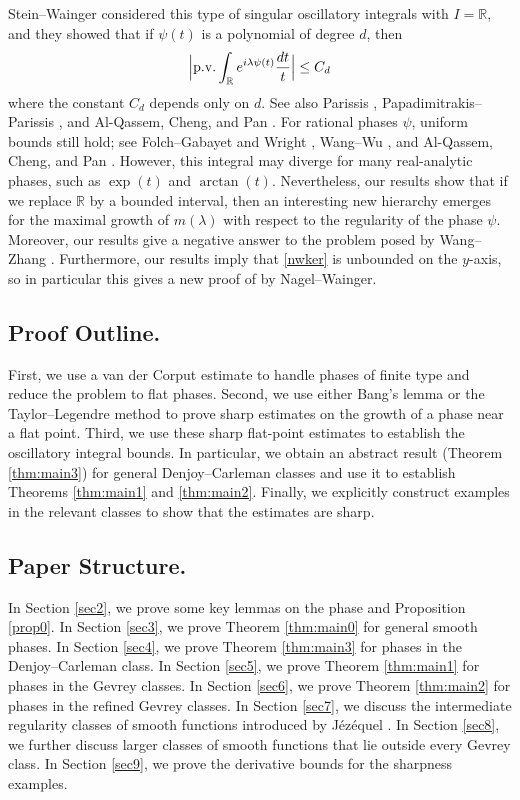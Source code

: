 \documentclass[11pt]{amsart}
\newcommand{\la}{\lambda}
\newcommand{\1}{{\rm 1\hspace*{-0.4ex}%
			\rule{0.1ex}{1.52ex}\hspace*{0.2ex}}}
\numberwithin{equation}{section}
\begin{document}
Stein--Wainger \cite{sw70} considered this type of singular oscillatory integrals with $I=\mathbb{R}$, and they showed that if $\psi(t)$ is a polynomial of degree $d$, then
\[\Big|{\rm p . v .} \int_{\mathbb{R}} e^{i\lambda\psi(t)} \frac{d t}{t}\Big|\le C_d\]
where the constant $C_d$ depends only on $d$. See also Parissis \cite{pa08}, Papadimitrakis--Parissis \cite{pp10}, and Al-Qassem, Cheng, and Pan \cite{acp14}. For rational phases $\psi$, uniform bounds still hold; see Folch--Gabayet and Wright \cite{fw03,fw032}, Wang--Wu \cite{ww23}, and Al-Qassem, Cheng, and Pan \cite{acp25}. However, this integral may diverge for many real-analytic phases, such as $\exp(t)$ and $\arctan(t)$. Nevertheless, our results show that if we replace $\mathbb{R}$ by a bounded interval, then an interesting new hierarchy emerges for the maximal growth of $m(\la)$ with respect to the regularity of the phase $\psi$. Moreover, our results give a negative answer to the problem posed by Wang--Zhang \cite[Problem 4 in Section 4]{wz21}. Furthermore, our results imply that \eqref{nwker} is unbounded on the $y$-axis, so in particular this gives a new proof of \cite[Theorem 4.1]{nw} by Nagel--Wainger.

\subsection{Proof Outline.} First, we use a van der Corput estimate to handle phases of finite type and reduce the problem to flat phases. Second, we use either Bang's lemma or the Taylor--Legendre method to prove sharp estimates on the growth of a phase near a flat point. Third, we use these sharp flat-point estimates to establish the oscillatory integral bounds. In particular, we obtain an abstract result (Theorem \ref{thm:main3}) for general Denjoy--Carleman classes and use it to establish Theorems \ref{thm:main1} and \ref{thm:main2}. Finally, we explicitly construct examples in the relevant classes to show that the estimates are sharp.

\subsection{Paper Structure.} In Section \ref{sec2}, we prove some key lemmas on the phase and Proposition \ref{prop0}. In Section \ref{sec3}, we prove Theorem \ref{thm:main0} for general smooth phases. In Section \ref{sec4}, we prove Theorem \ref{thm:main3} for phases in the Denjoy--Carleman class. In Section \ref{sec5}, we prove Theorem \ref{thm:main1} for phases in the Gevrey classes. In Section \ref{sec6}, we prove Theorem \ref{thm:main2} for phases in the refined Gevrey classes. In Section \ref{sec7}, we discuss the intermediate regularity classes of smooth functions introduced by Jézéquel \cite{jez}. In Section \ref{sec8}, we further discuss larger classes of smooth functions that lie outside every Gevrey class. In Section \ref{sec9}, we prove the derivative bounds for the sharpness examples.
\end{document}
